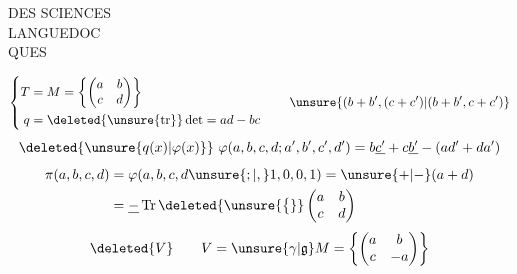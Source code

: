 DES SCIENCES\\
 LANGUEDOC\\
QUES


\[
\left\{\begin{aligned}
T&=M=\left\{\begin{pmatrix}a&b\\c&d\end{pmatrix}\right\}\\
q&=\deleted{\unsure{\mathrm{tr}}}\det=ad-bc
\end{aligned}\right.
\qquad\unsure{(b+b',(c+c')|(b+b',c+c')}
\]
\[
\deleted{\unsure{q(x)|\varphi(x)}}\ \varphi(a,b,c,d;a',b',c',d')
=b\underline{c'}+c\underline{b'}-(ad'+da')
\]
\[
\begin{aligned}
\pi(a,b,c,d)&=\varphi(a,b,c,d\unsure{;|,}1,0,0,1)=\unsure{+|-}(a+d)\\
&=\underline{-}\operatorname{Tr}\deleted{\unsure{\bigl\{}}\begin{pmatrix}a&b\\c&d\end{pmatrix}
\end{aligned}
\]
\[
\deleted{V}\qquad V=\unsure{\gamma|\mathfrak g}M=\left\{\begin{pmatrix}a&b\\c&-a\end{pmatrix}\right\}
\]
